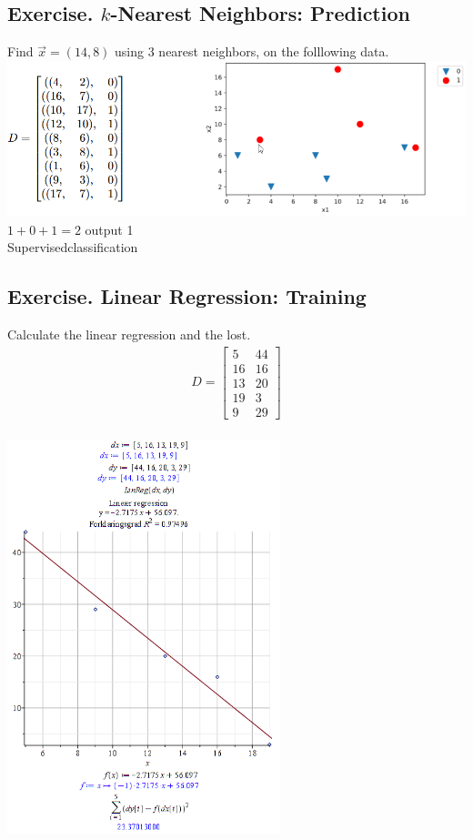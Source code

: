 \documentclass[12pt, a4paper]{article}
\begin{document}
		\subsection{Exercise. $k$-Nearest Neighbors: Prediction}
			Find $\vec{x}=(14,8)$ using 3 nearest neighbors, on the folllowing data.\\
			\includegraphics[width=\linewidth]{images/41,1,2.png}\\
			$1+0+1=2$ output 1\\
			Supervisedclassification
		\subsection{Exercise. Linear Regression: Training}
			Calculate the linear regression and the lost.
			\begin{align*}D=
			\left[\begin{array}{cc}
			    5&44\\
			    16&16\\
			    13&20\\
			    19&3\\
			    9&29
			\end{array}\right]
			\end{align*}\\
			\includegraphics[width=300px]{images/41,1,3.png}
\end{document}
